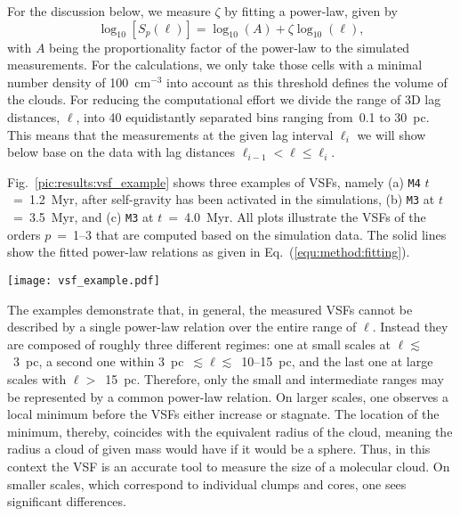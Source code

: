 For the discussion below, we measure $\zeta$ by fitting a power-law, given by
\begin{equation}
	\log_{10}\left[ S_p(\ell) \right] = \log_{10}\left(A\right) + \zeta \log_{10}(\ell) ,
    \label{equ:method:fitting}
\end{equation}
with $A$ being the proportionality factor of the power-law to the simulated measurements.
For the calculations, we only take those cells with a minimal number density of 100~cm$^{-3}$ into account as this threshold defines the volume of the clouds.
For reducing the computational effort we divide the range of 3D lag distances, $\ell$, into 40 equidistantly separated bins ranging from~0.1 to 30~pc.
This means that the measurements at the given lag interval $\ell_i$ we will show below base on the data with lag distances $\ell_{i-1} < \ell \leq \ell_i$.

Fig.~\ref{pic:results:vsf_example} shows three examples of VSFs, namely (a) \texttt{M4} $t$~=~1.2~Myr, after self-gravity has been activated in the simulations, (b) \texttt{M3} at $t$~=~3.5~Myr, and (c) \texttt{M3} at $t$~=~4.0~Myr.
All plots illustrate the VSFs of the orders $p$~=~1--3 that are computed based on the simulation data.
The solid lines show the fitted power-law relations as given in Eq.~(\ref{equ:method:fitting}).

\begin{figure*}[!htb]
	\centering
	\texttt{[image: vsf\_example.pdf]}
    \caption{Examples of velocity structure functions as function of the lag scale, $\ell$, and order, $p$. 
    	The dots (connected by dashed lines) illustrate the measured values based on the simulation data. 
        The solid lines represent the power-law relations fitted to the respective structure function.
	}
    \label{pic:results:vsf_example}
\end{figure*}

The examples demonstrate that, in general, the measured VSFs cannot be described by a single power-law relation over the entire range of $\ell$.
Instead they are composed of roughly three different regimes: 
one at small scales at $\ell \lesssim$~3~pc, a second one within 3~pc~$\lesssim \ell \lesssim$~10--15~pc, and the last one at large scales with $\ell >$~15~pc.
Therefore, only the small and intermediate ranges may be represented by a common power-law relation.
On larger scales, one observes a local minimum before the VSFs either increase or stagnate.
The location of the minimum, thereby, coincides with the equivalent radius of the cloud, meaning the radius a cloud of given mass would have if it would be a sphere.
Thus, in this context the VSF is an accurate tool to measure the size of a molecular cloud.
On smaller scales, which correspond to individual clumps and cores, one sees significant differences.

